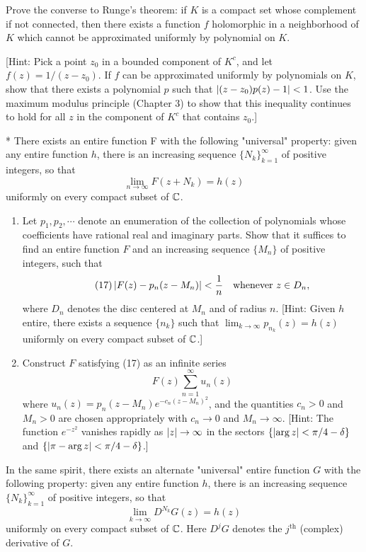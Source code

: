 \begin{exercise}
Prove the converse to Runge's theorem: if $K$ is a compact set whose complement if not connected, then there exists a function $f$ holomorphic in a neighborhood of $K$ which cannot be approximated uniformly by polynomial on $K$.

[Hint: Pick a point $z_0$ in a bounded component of $K^c$, and let $f(z)=1/(z-z_0)$. If $f$ can be approximated uniformly by polynomials on $K$, show that there exists a polynomial $p$ such that $\left\lvert (z-z_0)p(z) - 1 \right\rvert < 1$. Use the maximum modulus principle (Chapter 3) to show that this inequality continues to hold for all $z$ in the component of $K^c$ that contains $z_0$.]
\end{exercise}

\begin{exercise}
* There exists an entire function F with the following "universal" property: given any entire function $h$, there is an increasing sequence $\{N_k\}_{k=1}^\infty$ of positive integers, so that $$\lim_{n\to\infty} F(z+N_k)=h(z)$$ uniformly on every compact subset of $\mathbb{C}$.
\begin{enumerate}[label=(\alph*)]
\item Let $p_1,p_2,\cdots$ denote an enumeration of the collection of polynomials whose coefficients have rational real and imaginary parts. Show that it suffices to find an entire function $F$ and an increasing sequence $\{M_n\}$ of positive integers, such that \begin{equation}\tag{17}\left\lvert F(z)-p_n(z-M_n) \right\rvert<\frac{1}{n}\quad\text{whenever }z\in D_n,\end{equation} where $D_n$ denotes the disc centered at $M_n$ and of radius $n$. [Hint: Given $h$ entire, there exists a sequence $\{n_k\}$ such that $\lim_{k\to\infty}p_{n_k}(z)=h(z)$ uniformly on every compact subset of $\mathbb{C}$.]
\item Construct $F$ satisfying (17) as an infinite series $$F(z)\sum_{n=1}^\infty u_n(z)$$ where $u_n(z) = p_n(z - M_n)e^{-c_n(z-M_n)^2}$, and the quantities $c_n > 0$ and $M_n > 0$ are chosen appropriately with $c_n\to0$ and $M_n\to\infty$. [Hint: The function $e^{-z^2}$ vanishes rapidly as $\left\lvert z \right\rvert\to\infty$ in the sectors $\{\left\lvert \operatorname{arg}{z} \right\rvert< \pi/4 - \delta\}$ and $\{\left\lvert \pi-\operatorname{arg}{z} \right\rvert<\pi/4-\delta\}$.]
\end{enumerate}
In the same spirit, there exists an alternate "universal" entire function $G$ with the following property: given any entire function $h$, there is an increasing sequence $\{N_k\}_{k=1}^\infty$ of positive integers, so that $$\lim_{k\to\infty}D^{N_k}G(z)=h(z)$$ uniformly on every compact subset of $\mathbb{C}$. Here $D^jG$ denotes the $j^{\text{th}}$ (complex) derivative of $G$.
\end{exercise}